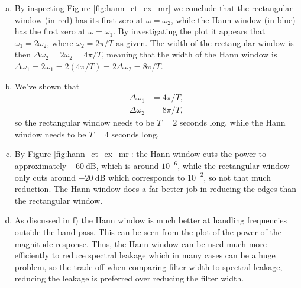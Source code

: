 \begin{enumerate}
\begin{enumerate}[a)]
\item By inspecting Figure \ref{fig:hann_ct_ex_mr} we conclude that the rectangular window (in red) has its first zero at $\omega=\omega_{2}$, while the Hann window (in blue) has the first zero at $\omega=\omega_{1}$. By investigating the plot it appears that $\omega_{1}=2\omega_{2}$, where $\omega_{2}=2\pi /T$ as given. The width of the rectangular window is then $\Delta\omega_{2}=2\omega_{2}=4\pi/T$, meaning that the width of the Hann window is $\Delta\omega_{1}=2\omega_{1}=2(4\pi/T)=2\Delta\omega_{2}=8\pi /T$. 

\item We've shown that 
\begin{align*}
    \Delta\omega_{1}&=4\pi/T, \\
    \Delta\omega_{2}&=8\pi/T,
\end{align*}
so the rectangular window needs to be $T=2$ seconds long, while the Hann window needs to be $T=4$ seconds long. 

\item By Figure \ref{fig:hann_ct_ex_mr}: the Hann window cuts the power to approximately $-60\ \text{dB}$, which is around $10^{-6}$, while the rectangular window only cuts around $-20\ \text{dB}$ which corresponds to $10^{-2}$, so not that much reduction. The Hann window does a far better job in reducing the edges than the rectangular window.

\item As discussed in f) the Hann window is much better at handling frequencies outside the band-pass. This can be seen from the plot of the power of the magnitude response. Thus, the Hann window can be used much more efficiently to reduce spectral leakage which in many cases can be a huge problem, so the trade-off when comparing filter width to spectral leakage, reducing the leakage is preferred over reducing the filter width.


\end{enumerate}
\end{enumerate}